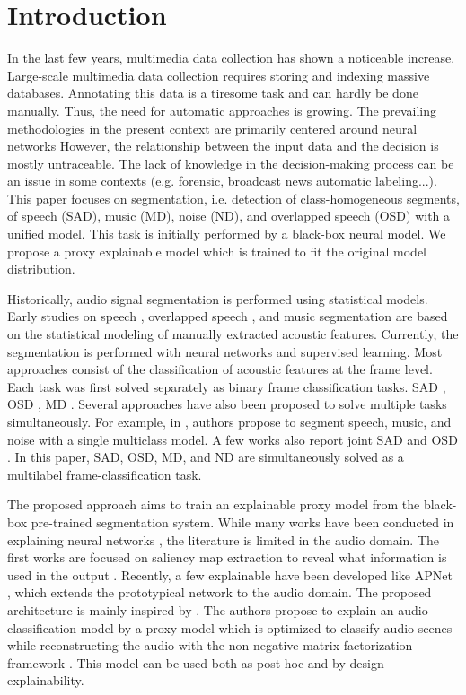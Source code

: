 \section{Introduction}

In the last few years, multimedia data collection has shown a noticeable increase.
Large-scale multimedia data collection requires storing and indexing massive databases.
Annotating this data is a tiresome task and can hardly be done manually.
Thus, the need for automatic approaches is growing.
The prevailing methodologies in the present context are primarily centered around neural networks
However, the relationship between the input data and the decision is mostly untraceable.
The lack of knowledge in the decision-making process can be an issue in some contexts (e.g. forensic, broadcast news automatic labeling...). 
This paper focuses on segmentation, i.e. detection of class-homogeneous segments, of speech (SAD), music (MD), noise (ND), and overlapped speech (OSD) with a unified model.
This task is initially performed by a black-box neural model. 
We propose a proxy explainable model which is trained to fit the original model distribution. 

Historically, audio signal segmentation is performed using statistical models.
Early studies on speech \cite{sohn1999statistical}, overlapped speech \cite{charlet_impact_2013}, and music \cite{lavner2009decision} segmentation are based on the statistical modeling of manually extracted acoustic features.
Currently, the segmentation is performed with neural networks and supervised learning.
Most approaches consist of the classification of acoustic features at the frame level.
Each task was first solved separately as binary frame classification tasks.
SAD \cite{lavechin2019end}, OSD \cite{bullock_overlap-aware_2020,lebourdais22_interspeech}, MD \cite{jang2019music,de2019exploring}.
Several approaches have also been proposed to solve multiple tasks simultaneously.
For example, in \cite{gimeno2020multiclass}, authors propose to segment speech, music, and noise with a single multiclass model.
A few works also report joint SAD and OSD \cite{jung21_interspeech,Cornell2022,lebourdais2023joint}.
In this paper, SAD, OSD, MD, and ND are simultaneously solved as a multilabel frame-classification task.

The proposed approach aims to train an explainable proxy model from the black-box pre-trained segmentation system.
While many works have been conducted in explaining neural networks \cite{}, the literature is limited in the audio domain.
The first works are focused on saliency map extraction to reveal what information is used in the output \cite{}.
Recently, a few explainable have been developed like APNet \cite{zinemanas2021interpretable}, which extends the prototypical network to the audio domain.
The proposed architecture is mainly inspired by \cite{parekh2023tackling}.
The authors propose to explain an audio classification model by a proxy model which is optimized to classify audio scenes while reconstructing the audio with the non-negative matrix factorization framework \cite{lee2000algorithms}.
This model can be used both as post-hoc and by design explainability.

